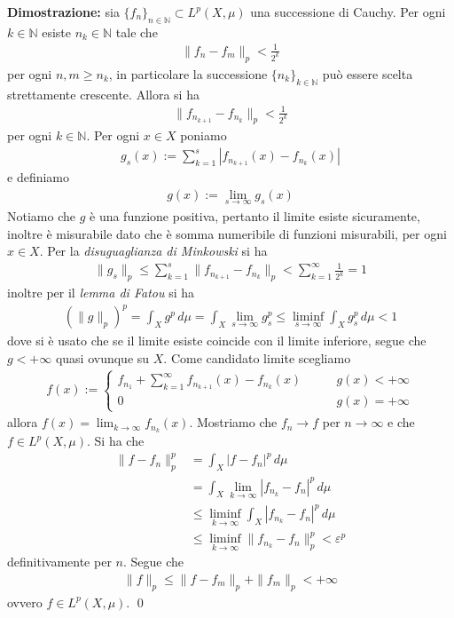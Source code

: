 \documentclass{article}
\numberwithin{equation}{subsection}
\begin{document}
\textbf{Dimostrazione:} sia $\{f_n\}_{n \in \mathbb{N}} \subset L^p(X, \mu)$ una successione di Cauchy. Per ogni $k \in \mathbb{N}$ esiste $n_k \in \mathbb{N}$ tale che 
\begin{align*}
    \|f_n - f_m\|_p < \frac{1}{2^k} 
\end{align*}
per ogni $n, m \geq n_k$, in particolare la successione $\{n_k\}_{k \in \mathbb{N}}$ può essere scelta strettamente crescente. Allora si ha 
\begin{align*}
    \|f_{n_{k + 1}} - f_{n_k}\|_p < \frac{1}{2^k} 
\end{align*}
per ogni $k \in \mathbb{N}$. Per ogni $x \in X$ poniamo 
\begin{align*}
    g_s(x) := \sum_{k = 1}^s |f_{n_{k + 1}}(x) - f_{n_k}(x)| 
\end{align*}
e definiamo
\begin{align*}
    g(x) := \lim_{s \rightarrow \infty}g_s(x) 
\end{align*}
Notiamo che $g$ è una funzione positiva, pertanto il limite esiste sicuramente, inoltre è misurabile dato che è somma numeribile di funzioni misurabili, per ogni $x \in X$. Per la \textit{disuguaglianza di Minkowski} si ha 
\begin{align*}
    \|g_s\|_p \leq \sum_{k = 1}^s\|f_{n_{k + 1}} - f_{n_k}\|_p < \sum_{k = 1}^\infty \frac{1}{2^k} = 1 
\end{align*}
inoltre per il \textit{lemma di Fatou} si ha 
\begin{align*}
    (\|g\|_p)^p = \int_X g^p \, d\mu = \int_X \lim_{s \rightarrow \infty} g^p_s \leq \liminf_{s \rightarrow \infty}\int_X g^p_s \, d\mu < 1 
\end{align*}
dove si è usato che se il limite esiste coincide con il limite inferiore, segue che $g < +\infty$ quasi ovunque su $X$. Come candidato limite scegliamo 
\begin{align*}
    f(x) := \begin{cases}
        f_{n_1} + \sum_{k = 1}^\infty f_{n_{k + 1}}(x) - f_{n_k}(x) \qquad &g(x) < +\infty \\
        0 \qquad &g(x) = +\infty 
    \end{cases} 
\end{align*}
allora $f(x) = \lim_{k \rightarrow \infty}f_{n_k}(x)$. Mostriamo che $f_n \rightarrow f$ per $n \rightarrow \infty$ e che $f \in L^p(X, \mu)$. Si ha che 
\begin{align*}
    \|f - f_n\|^p_p &= \int_X |f - f_n|^p \, d\mu  \\
    &= \int_X \lim_{k \rightarrow \infty}|f_{n_k} - f_n|^p \, d\mu  \\
    &\leq \liminf_{k \rightarrow \infty}\int_X |f_{n_k} - f_n|^p \, d\mu  \\
    &\leq \liminf_{k \rightarrow \infty}\|f_{n_k} - f_n\|^p_p < \varepsilon^p 
\end{align*}
definitivamente per $n$. Segue che
\begin{align*}
    \|f\|_p \leq \|f - f_m\|_p + \|f_m\|_p < +\infty 
\end{align*}
ovvero $f \in L^p(X, \mu)$. \qed 
\end{document}
